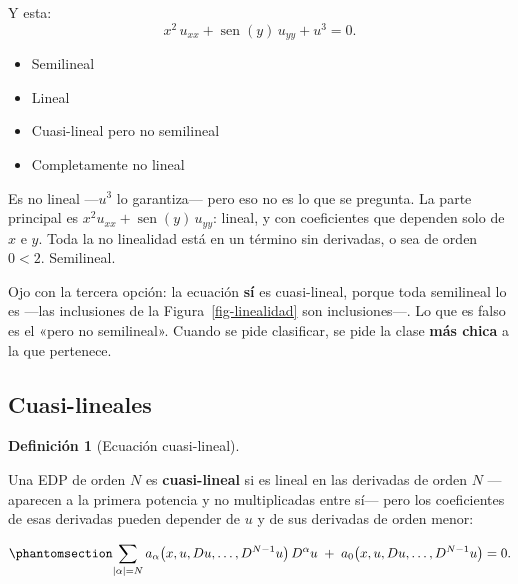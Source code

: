 \documentclass[
  spanish,
  a4paper,
]{scrbook}
\providecommand{\tightlist}{%
  \setlength{\itemsep}{0pt}\setlength{\parskip}{0pt}}
\theoremstyle{definition}
\newtheorem{definition}{Definición}[chapter]
\theoremstyle{plain}
\theoremstyle{definition}
\theoremstyle{plain}
\theoremstyle{definition}
\theoremstyle{remark}
\begin{document}
Y esta: \[x^2\,u_{xx} + \operatorname{sen}(y)\,u_{yy} + u^3 = 0.\]

\begin{itemize}
\tightlist
\item
  {Semilineal}
\item
  {Lineal}
\item
  {Cuasi-lineal pero no semilineal}
\item
  {Completamente no lineal}
\end{itemize}

Es no lineal ---\(u^3\) lo garantiza--- pero eso no es lo que se
pregunta. La parte principal es
\(x^2u_{xx} + \operatorname{sen}(y)\,u_{yy}\): lineal, y con
coeficientes que dependen solo de \(x\) e \(y\). Toda la no linealidad
está en un término sin derivadas, o sea de orden \(0 < 2\). Semilineal.

Ojo con la tercera opción: la ecuación \textbf{sí} es cuasi-lineal,
porque toda semilineal lo es ---las inclusiones de la
Figura~\ref{fig-linealidad} son inclusiones---. Lo que es falso es el
«pero no semilineal». Cuando se pide clasificar, se pide la clase
\textbf{más chica} a la que pertenece.

\subsection{Cuasi-lineales}\label{sec-cuasilineales-def}

\begin{definition}[Ecuación
cuasi-lineal]\protect\hypertarget{def-cuasilineal}{}\label{def-cuasilineal}

Una EDP de orden \(N\) es \textbf{cuasi-lineal} si es lineal en las
derivadas de orden \(N\) ---aparecen a la primera potencia y no
multiplicadas entre sí--- pero los coeficientes de esas derivadas pueden
depender de \(u\) y de sus derivadas de orden menor:

\begin{equation}\protect\phantomsection\label{eq-cuasilineal}{
\sum_{|\alpha| = N} a_\alpha\big(x,u,Du,\dots,D^{N-1}u\big)\, D^\alpha u
\;+\; a_0\big(x,u,Du,\dots,D^{N-1}u\big) = 0 .
}\end{equation}

\end{definition}
\end{document}
